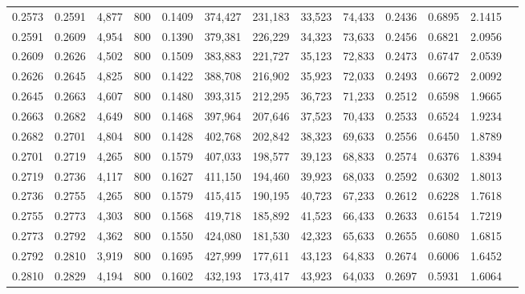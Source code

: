 \begin{tabular}{rrrrrrrrrrrrr}
0.2573 & 0.2591 &  4,877 &   800 &                                     0.1409 & 374,427 & 231,183 &  33,523 &  74,433 & 0.2436 & 0.6895 & 2.1415 \\
0.2591 & 0.2609 &  4,954 &   800 &                                     0.1390 & 379,381 & 226,229 &  34,323 &  73,633 & 0.2456 & 0.6821 & 2.0956 \\
0.2609 & 0.2626 &  4,502 &   800 &                                     0.1509 & 383,883 & 221,727 &  35,123 &  72,833 & 0.2473 & 0.6747 & 2.0539 \\
0.2626 & 0.2645 &  4,825 &   800 &                                     0.1422 & 388,708 & 216,902 &  35,923 &  72,033 & 0.2493 & 0.6672 & 2.0092 \\
0.2645 & 0.2663 &  4,607 &   800 &                                     0.1480 & 393,315 & 212,295 &  36,723 &  71,233 & 0.2512 & 0.6598 & 1.9665 \\
0.2663 & 0.2682 &  4,649 &   800 &                                     0.1468 & 397,964 & 207,646 &  37,523 &  70,433 & 0.2533 & 0.6524 & 1.9234 \\
0.2682 & 0.2701 &  4,804 &   800 &                                     0.1428 & 402,768 & 202,842 &  38,323 &  69,633 & 0.2556 & 0.6450 & 1.8789 \\
0.2701 & 0.2719 &  4,265 &   800 &                                     0.1579 & 407,033 & 198,577 &  39,123 &  68,833 & 0.2574 & 0.6376 & 1.8394 \\
0.2719 & 0.2736 &  4,117 &   800 &                                     0.1627 & 411,150 & 194,460 &  39,923 &  68,033 & 0.2592 & 0.6302 & 1.8013 \\
0.2736 & 0.2755 &  4,265 &   800 &                                     0.1579 & 415,415 & 190,195 &  40,723 &  67,233 & 0.2612 & 0.6228 & 1.7618 \\
0.2755 & 0.2773 &  4,303 &   800 &                                     0.1568 & 419,718 & 185,892 &  41,523 &  66,433 & 0.2633 & 0.6154 & 1.7219 \\
0.2773 & 0.2792 &  4,362 &   800 &                                     0.1550 & 424,080 & 181,530 &  42,323 &  65,633 & 0.2655 & 0.6080 & 1.6815 \\
0.2792 & 0.2810 &  3,919 &   800 &                                     0.1695 & 427,999 & 177,611 &  43,123 &  64,833 & 0.2674 & 0.6006 & 1.6452 \\
0.2810 & 0.2829 &  4,194 &   800 &                                     0.1602 & 432,193 & 173,417 &  43,923 &  64,033 & 0.2697 & 0.5931 & 1.6064 \\

\end{tabular}
